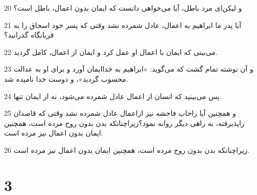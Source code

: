 \par 20 و لیکن‌ای مرد باطل، آیا می‌خواهی دانست که ایمان بدون اعمال، باطل است؟
\par 21 آیا پدر ما ابراهیم به اعمال، عادل شمرده نشد وقتی که پسر خود اسحاق را به قربانگاه گذرانید؟
\par 22 می‌بینی که ایمان با اعمال او عمل کرد و ایمان از اعمال، کامل گردید.
\par 23 و آن نوشته تمام گشت که می‌گوید: «ابراهیم به خداایمان آورد و برای او به عدالت محسوب گردید»، و دوست خدا نامیده شد.
\par 24 پس می‌بینید که انسان از اعمال عادل شمرده می‌شود، نه از ایمان تنها.
\par 25 و همچنین آیا راحاب فاحشه نیز ازاعمال عادل شمرده نشد وقتی که قاصدان راپذیرفته، به راهی دیگر روانه نمود؟زیراچنانکه بدن بدون روح مرده است، همچنین ایمان بدون اعمال نیز مرده است.
\par 26 زیراچنانکه بدن بدون روح مرده است، همچنین ایمان بدون اعمال نیز مرده است.

\chapter{3}

